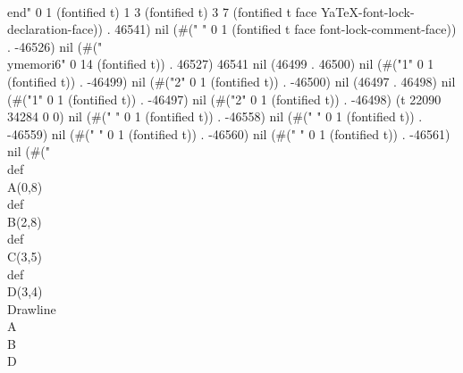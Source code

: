   \\end" 0 1 (fontified t) 1 3 (fontified t) 3 7 (fontified t face YaTeX-font-lock-declaration-face)) . 46541) nil (#("
" 0 1 (fontified t face font-lock-comment-face)) . -46526) nil (#("   \\ymemori{6}" 0 14 (fontified t)) . 46527) 46541 nil (46499 . 46500) nil (#("1" 0 1 (fontified t)) . -46499) nil (#("2" 0 1 (fontified t)) . -46500) nil (46497 . 46498) nil (#("1" 0 1 (fontified t)) . -46497) nil (#("2" 0 1 (fontified t)) . -46498) (t 22090 34284 0 0) nil (#("
" 0 1 (fontified t)) . -46558) nil (#(" " 0 1 (fontified t)) . -46559) nil (#(" " 0 1 (fontified t)) . -46560) nil (#(" " 0 1 (fontified t)) . -46561) nil (#("\\def\\A{(0,8)}
   \\def\\B{(2,8)}
   \\def\\C{(3,5)}
   \\def\\D{(3,4)}
   \\Drawline{\\A\\B\\D}

